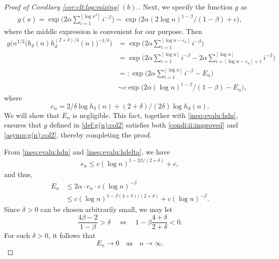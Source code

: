 \documentclass[11pt,a4,leqno]{amsart}
\newcommand{\1}{{\mathbf 1}}
\begin{document}
\begin{proof}[Proof of Corollary \ref{cor:clt:log:mixing} $(b)$.]
Next, we specify the function $g$ as
\begin{align}
\label{def:g(n):col2}
    g(x) = \exp \Big( 2\alpha \sum_{i=1}^{[\log x^2]} i^{-\beta} \Big) 
    \sim \exp\Big( 2\alpha (2\log n)^{1-\beta}/(1-\beta) + c \Big), 
\end{align}
where the middle expression is convenient for our purpose. Then 
\begin{align*}
    g\Big( n^{1/2}\big(h_\delta(n)h_d^{(2+\delta)/4}(n)\big)^{-1/\delta}\Big) 
    &= \exp \Big( 2\alpha \sum_{i=1}^{[\log n-e_n]} i^{-\beta} \Big) \\
    &= \exp \Big( 2\alpha \sum_{i=1}^{[\log n]} i^{-\beta} - 2\alpha \sum_{i=[\log n-e_n]+1}^{[\log n]} i^{-\beta} \Big) \\
    &=: \exp \Big( 2\alpha \sum_{i=1}^{[\log n]} i^{-\beta} - E_n \Big)\\
    &\sim c \exp \Big( 2\alpha (\log n)^{1-\beta}/(1-\beta) - E_n \Big), 
\end{align*}
where 
\[
 e_n = 2/\delta \log h_\delta(n) +(2+\delta)/(2\delta) \log h_d(n).
\]
We will show that $E_n$ is negligible. This fact, together with \eqref{ineq:evalu:hdn}, ensures that $g$ defined in \eqref{def:g(n):col2} satisfies both \eqref{condi:ii:improved} and \eqref{asymp:g(n):col2}, thereby completing the proof. 

From \eqref{ineq:evalu:hdn} and \eqref{ineq:evalu:hdelta}, we have 
\begin{align*}
    e_n \le c (\log n)^{1-2\beta/(2+\delta)} + c,
\end{align*}
and thus, 
\begin{align*}
    E_n &\le 2 \alpha \cdot e_n \cdot c (\log n)^{-\beta} \\
    &\le c (\log n)^{1-\beta(4+\delta)/(2+\delta)} + c (\log n)^{-\beta}. 
\end{align*}
Since $\delta > 0$ can be chosen arbitrarily small, we may let 
\[
    \frac{4\beta - 2}{1-\beta} > \delta \quad \Leftrightarrow \quad 1 - \beta \frac{4+\delta}{2+\delta} < 0.
\]
For such $\delta > 0$, it follows that 
\[
    E_n \to 0 \quad \text{as} \quad n \to \infty.
\]


\end{proof}
\end{document}
